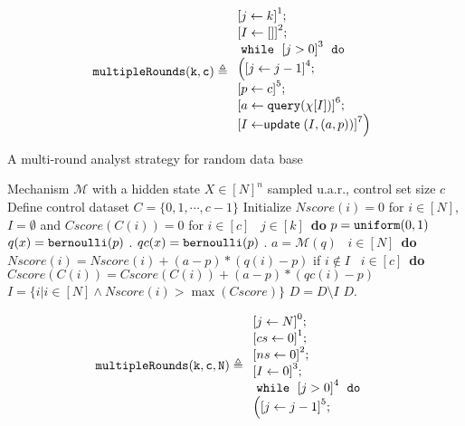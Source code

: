 \begin{example}
%
\[
%
\kw{multipleRounds(k, c)} \triangleq
\begin{array}{l}
     \left[j \leftarrow k \right]^1 ; \\
    \left[I \leftarrow [] \right]^2; \\
    \ewhile ~ \clabel{j > 0}^{3} ~ \edo ~ \\
    \Big(
    \clabel{\assign{j}{j-1}}^{4} ;\\
    \left[p \leftarrow c \right]^5; \\
    \left[ a \leftarrow \query (\chi[I]) \right]^6;\\
    \left[I \leftarrow \mathrel{\mathsf{update}} ( {I}, (a, p))  \right]^7
    \Big) 
\end{array}
\]
%
\begin{algorithm}
\footnotesize
\caption{A multi-round analyst strategy for random data base \cite{dwork2015preserving}}
\label{alg:multiRound}
\begin{algorithmic}
\REQUIRE Mechanism $\mathcal{M}$ with a hidden state $X\in [N]^{n}$ sampled u.a.r., control set size $c$
\STATE Define control dataset $C = \{0,1, \cdots, c - 1\}$
\STATE Initialize $Nscore(i) = 0$ for $i \in [N]$, $I = \emptyset$ and $Cscore(C(i)) = 0$ for $i \in [c]$
\ $j\in [k]$\ {\bf do} 
\STATE {} $p=\mathtt{uniform}(0,1)$ 
\STATE {} $q (x) = \mathtt{bernoulli} ( p )$ .
\STATE {} $qc (x) = \mathtt{bernoulli} ( p )$ .
\STATE {} $a = \mathcal{M}(q)$ 
\STATE {}\ $i \in [N]$\ {\bf do}
\STATE \qquad \qquad $Nscore(i) = Nscore(i) + (a - p)*(q (i) - p)$ if $i \notin I$
\STATE {}\ $i \in [c]$\ {\bf do}
\STATE \qquad \qquad $Cscore(C(i)) = Cscore(C(i)) + (a - p)*(qc (i) - p)$
\STATE {} $I = \{i | i\in [N] \land Nscore(i) > \max(Cscore)\}$
\STATE {} $D = D \setminus I$ 
\RETURN $D$.
\end{algorithmic}
\end{algorithm}
%
\[
%
\kw{multipleRounds(k, c, N)} \triangleq
\begin{array}{l}
    \clabel{\assign{j}{N}}^0 ; \\
     \clabel{\assign{cs}{0}}^1; \\
     \clabel{\assign{ns}{0}}^2; \\
     \clabel{\assign{I}{0}}^3; \\
     \ewhile ~ \clabel{j > 0}^{4} ~ \edo ~ \\
     \Big(
     \clabel{\assign{j}{j-1}}^{5} ;\\

\end{array}\]
\end{example}
